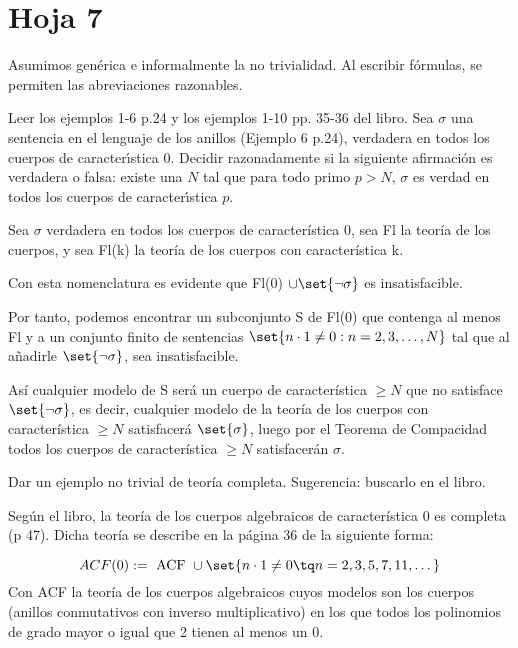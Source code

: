 \section{Hoja 7}

Asumimos genérica e informalmente la no trivialidad. Al escribir fórmulas, se permiten
las abreviaciones razonables.

\begin{problem}
Leer los ejemplos 1-6 p.24 y los ejemplos 1-10  pp. 35-36 del libro. Sea $\sigma$
una sentencia en el lenguaje de los anillos (Ejemplo 6 p.24), verdadera en todos los
cuerpos de caracter\'{\i}stica 0. Decidir razonadamente si la siguiente afirmaci\'on
es verdadera o falsa: existe una $N$ tal que para todo primo $p > N$, $\sigma$ es verdad
en todos los cuerpos de caracter\'{\i}stica $p$.
\solution


Sea $\sigma$ verdadera en todos los cuerpos de característica 0, sea Fl la teoría de los cuerpos, y sea Fl(k) la teoría de los cuerpos con característica k.

Con esta nomenclatura es evidente que Fl(0) $\cup \set{\neg \sigma}$ es insatisfacible.

Por tanto, podemos encontrar un subconjunto S de Fl(0) que contenga al menos Fl y a un conjunto finito de sentencias $\set{n \cdot 1 \neq 0 : n=2,3,\dots, N}$ tal que al añadirle $\set{\neg \sigma}$, sea insatisfacible.

Así cualquier modelo de S será un cuerpo de característica $\geq N$ que no satisface $\set{\neg \sigma}$, es decir, cualquier modelo de la teoría de los cuerpos con característica $\geq N$ satisfacerá $\set{ \sigma}$, luego por el Teorema de Compacidad todos los cuerpos de característica $\geq N$ satisfacerán $\sigma$.
\end{problem}

\begin{problem}
Dar un ejemplo no trivial de teoría completa. Sugerencia: buscarlo en el libro.
\solution

Según el libro, la teoría de los cuerpos algebraicos de característica 0 es completa (p 47).
Dicha teoría se describe en la página 36 de la siguiente forma:

\[ ACF(0) := \text{ ACF } \cup \set{n \cdot 1 \neq 0 \tq n = 2,3,5,7,11, \dots} \]
Con ACF la teoría de los cuerpos algebraicos cuyos modelos son los cuerpos (anillos conmutativos con inverso multiplicativo) en los que todos los polinomios de grado mayor o igual que 2 tienen al menos un 0.
\end{problem}

